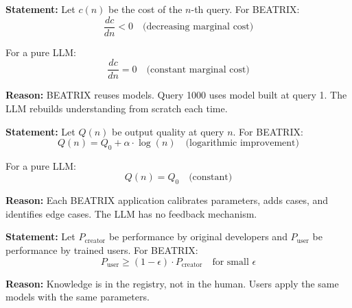 \begin{tcolorbox}[colback=gray!5!white, colframe=gray!75!black,
    title=Axiom UNMAPPED_BX-5: Marginal Cost Reduction]
\textbf{Statement:} Let $c(n)$ be the cost of the $n$-th query. For BEATRIX:
\begin{equation}
\frac{dc}{dn} < 0 \quad \text{(decreasing marginal cost)}
\end{equation}

For a pure LLM:
\begin{equation}
\frac{dc}{dn} = 0 \quad \text{(constant marginal cost)}
\end{equation}

\textbf{Reason:} BEATRIX reuses models. Query 1000 uses model built at query 1. The LLM rebuilds understanding from scratch each time.
\end{tcolorbox}

\begin{tcolorbox}[colback=gray!5!white, colframe=gray!75!black,
    title=Axiom UNMAPPED_BX-6: Quality Improvement with N]
\textbf{Statement:} Let $Q(n)$ be output quality at query $n$. For BEATRIX:
\begin{equation}
Q(n) = Q_0 + \alpha \cdot \log(n) \quad \text{(logarithmic improvement)}
\end{equation}

For a pure LLM:
\begin{equation}
Q(n) = Q_0 \quad \text{(constant)}
\end{equation}

\textbf{Reason:} Each BEATRIX application calibrates parameters, adds cases, and identifies edge cases. The LLM has no feedback mechanism.
\end{tcolorbox}

\begin{tcolorbox}[colback=gray!5!white, colframe=gray!75!black,
    title=Axiom UNMAPPED_BX-7: Creator Independence]
\textbf{Statement:} Let $P_{\text{creator}}$ be performance by original developers and $P_{\text{user}}$ be performance by trained users. For BEATRIX:
\begin{equation}
P_{\text{user}} \geq (1 - \epsilon) \cdot P_{\text{creator}} \quad \text{for small } \epsilon
\end{equation}

\textbf{Reason:} Knowledge is in the registry, not in the human. Users apply the same models with the same parameters.
\end{tcolorbox}


